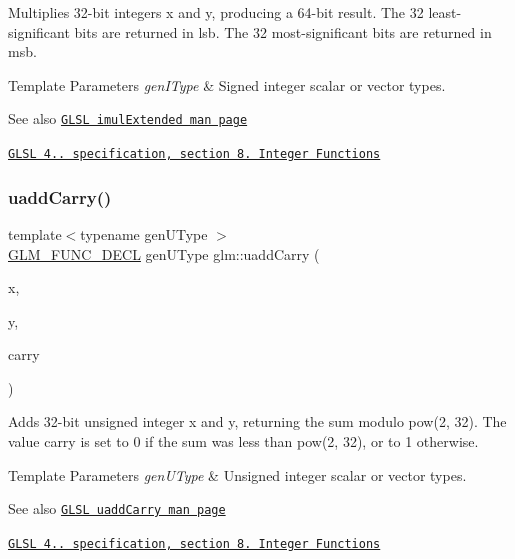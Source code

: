 Multiplies 32-\/bit integers x and y, producing a 64-\/bit result. The 32 least-\/significant bits are returned in lsb. The 32 most-\/significant bits are returned in msb.


\begin{DoxyTemplParams}{Template Parameters}
{\em gen\+I\+Type} & Signed integer scalar or vector types.\\
\hline
\end{DoxyTemplParams}
\begin{DoxySeeAlso}{See also}
\href{http://www.opengl.org/sdk/docs/manglsl/xhtml/imulExtended.xml}{\tt G\+L\+SL imul\+Extended man page} 

\href{http://www.opengl.org/registry/doc/GLSLangSpec.4.20.8.pdf}{\tt G\+L\+SL 4.. specification, section 8. Integer Functions} 
\end{DoxySeeAlso}
\mbox{\label{group__core__func__integer_ga19276bb7adbe9f0d74515ae49e40b481}} 
\subsubsection{\texorpdfstring{uadd\+Carry()}{uaddCarry()}}
{\footnotesize\ttfamily template$<$typename gen\+U\+Type $>$ \\
\hyperlink{setup_8hpp_ab2d052de21a70539923e9bcbf6e83a51}{G\+L\+M\+\_\+\+F\+U\+N\+C\+\_\+\+D\+E\+CL} gen\+U\+Type glm\+::uadd\+Carry (\begin{DoxyParamCaption}\item[{gen\+U\+Type const \&}]{x,  }\item[{gen\+U\+Type const \&}]{y,  }\item[{gen\+U\+Type \&}]{carry }\end{DoxyParamCaption})}

Adds 32-\/bit unsigned integer x and y, returning the sum modulo pow(2, 32). The value carry is set to 0 if the sum was less than pow(2, 32), or to 1 otherwise.


\begin{DoxyTemplParams}{Template Parameters}
{\em gen\+U\+Type} & Unsigned integer scalar or vector types.\\
\hline
\end{DoxyTemplParams}
\begin{DoxySeeAlso}{See also}
\href{http://www.opengl.org/sdk/docs/manglsl/xhtml/uaddCarry.xml}{\tt G\+L\+SL uadd\+Carry man page} 

\href{http://www.opengl.org/registry/doc/GLSLangSpec.4.20.8.pdf}{\tt G\+L\+SL 4.. specification, section 8. Integer Functions} 
\end{DoxySeeAlso}
\mbox{\label{group__core__func__integer_gad991bf53779a4309a920bb7bfcf2639c}} 
